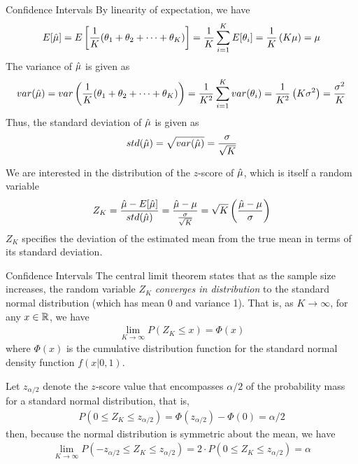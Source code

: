 \begin{frame}{Conf\/{i}dence Intervals}
By linearity of expectation, we have
\begin{align*}
  E[\hat{\mu}] = E\left[{1\over K} (\theta_1 + \theta_2 + \cdots + \theta_K)\right] =
  {1\over K} \sum_{i=1}^K E[\theta_i] = {1\over K} \left(K\mu\right) = \mu
\end{align*}
The
variance of $\hat{\mu}$ is given as
\begin{align*}
  var(\hat{\mu}) = var\left({1\over K} (\theta_1 + \theta_2 + \cdots +
  \theta_K)\right)
  = {1 \over K^2} \sum_{i=1}^K var(\theta_i) =
  {1 \over K^2} \left(K\sigma^2\right)
  ={\sigma^2 \over K}
\end{align*}
Thus, the standard deviation of $\hat{\mu}$ is given as
\begin{align*}
  std(\hat{\mu})  = \sqrt{var(\hat{\mu})} = {\sigma \over \sqrt{K}}
\end{align*}

\medskip
We are interested in the distribution of the $z$-score of $\hat{\mu}$,
which is itself a random variable
\begin{align*}
  Z_K = {\hat{\mu} - E[\hat{\mu}] \over std(\hat{\mu})} = {\hat{\mu} - \mu \over
  \frac{\sigma}{\sqrt{K}}} = \sqrt{K} \left({\hat{\mu} - \mu \over \sigma}\right)
\end{align*}
$Z_K$ specif\/{i}es the deviation of the estimated mean from the true
mean in terms of its standard deviation. 
\end{frame}


\begin{frame}{Conf\/{i}dence Intervals}
The central limit theorem
states that as the sample size increases, the
random variable $Z_K$ {\em converges in distribution}
to the standard normal
distribution (which has mean 0 and variance 1). That is,
as $K \to \infty$,  for any $x \in {\mathord{\mathbb R}}$, we have
\begin{align*}
\lim_{K\to\infty} P(Z_K \le x) = \Phi(x)
\end{align*}
where $\Phi(x)$ is the cumulative distribution function for the
standard normal density function $f(x| 0,1)$. 

\medskip
Let $z_{\alpha/2}$
denote the $z$-score value that encompasses $\alpha/2$ of the
probability mass for a standard normal distribution, that is,
\begin{align*}
  P(0 \le Z_K \le z_{\alpha/2}) = \Phi(z_{\alpha/2}) - \Phi(0) =
  \alpha/2
\end{align*}
then, because the normal distribution is symmetric about the mean,
we have
\begin{align*}
  \lim_{K\to\infty} P(-z_{\alpha/2} \le Z_K \le z_{\alpha/2}) =
  2 \cdot P(0 \le Z_K \le z_{\alpha/2}) = \alpha
\end{align*}

\end{frame}

